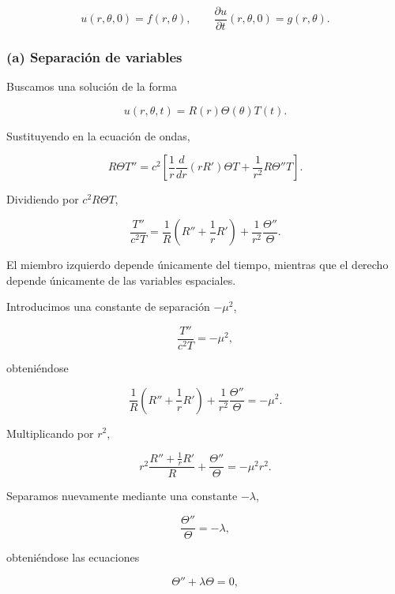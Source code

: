 \documentclass[12pt]{article}
\begin{document}
\begin{equation}
u(r,\theta,0)=f(r,\theta),
\qquad
\frac{\partial u}{\partial t}(r,\theta,0)=g(r,\theta).
\end{equation}

\subsubsection*{(a) Separación de variables}

Buscamos una solución de la forma

\begin{equation}
u(r,\theta,t)=R(r)\Theta(\theta)T(t).
\end{equation}

Sustituyendo en la ecuación de ondas,

\[
R\Theta T''
=
c^2
\left[
\frac1r
\frac{d}{dr}(rR')
\Theta T
+
\frac1{r^2}
R\Theta''T
\right].
\]

Dividiendo por $c^2R\Theta T$,

\begin{equation}
\frac{T''}{c^2T}
=
\frac1R
\left(
R''+\frac1rR'
\right)
+
\frac1{r^2}
\frac{\Theta''}{\Theta}.
\end{equation}

El miembro izquierdo depende únicamente del tiempo, mientras que el derecho depende únicamente de las variables espaciales.

Introducimos una constante de separación $-\mu^2$,

\begin{equation}
\frac{T''}{c^2T}
=
-\mu^2,
\end{equation}

obteniéndose

\begin{equation}
\frac1R
\left(
R''+\frac1rR'
\right)
+
\frac1{r^2}
\frac{\Theta''}{\Theta}
=
-\mu^2.
\end{equation}

Multiplicando por $r^2$,

\[
r^2
\frac{R''+\frac1rR'}{R}
+
\frac{\Theta''}{\Theta}
=
-\mu^2r^2.
\]

Separamos nuevamente mediante una constante $-\lambda$,

\begin{equation}
\frac{\Theta''}{\Theta}
=
-\lambda,
\end{equation}

obteniéndose las ecuaciones

\begin{equation}
\boxed{
\Theta''+\lambda\Theta=0,
}
\end{equation}
\end{document}
